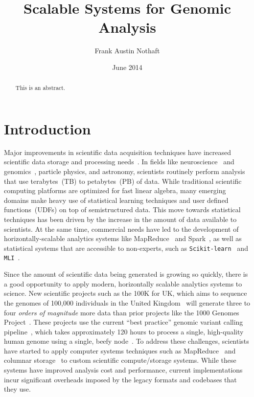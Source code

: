 \documentclass[10pt]{report} %
\begin{document}
\title{Scalable Systems for Genomic Analysis}
\author{Frank Austin Nothaft}
\date{June 2014}
\maketitle

\begin{abstract}
This is an abstract.
\end{abstract}

\tableofcontents

\chapter{Introduction}

Major improvements in scientific data acquisition techniques have increased scientific data storage and
processing needs~\cite{cunningham14, schadt10}. In fields like
neuroscience~\cite{freeman14} and genomics~\cite{stein10}, particle physics, and astronomy,
scientists routinely perform analysis that use terabytes~(TB) to petabytes~(PB) of data.
While traditional scientific computing platforms are optimized for fast linear algebra, many emerging
domains make heavy use of statistical learning techniques and user defined functions~(UDFs) on top of
semistructured data. This move towards statistical techniques has been driven by the increase in the
amount of data available to scientists. At the same time, commercial needs have led to the development of
horizontally-scalable analytics systems like MapReduce~\cite{dean04, dean08} and Spark~\cite{zaharia10}, as
well as statistical systems that are accessible to non-experts, such as \texttt{Scikit-learn}~\cite{pedregosa11} and
\texttt{MLI}~\cite{sparks13}.

Since the amount of scientific data being generated is growing so quickly, there is a good opportunity to apply
modern, horizontally scalable analytics systems to science. New scientific
projects such as the 100K for UK, which aims to sequence the genomes of 100,000 individuals in the
United Kingdom~\cite{uk100k} will generate three to four \emph{orders of magnitude} more data than
prior projects like the 1000 Genomes Project~\cite{siva08}. These projects use the current ``best
practice'' genomic variant calling pipeline~\cite{auwera13}, which takes approximately 120 hours to
process a single, high-quality human genome using a single, beefy node~\cite{talwalkar14}. To address
these challenges, scientists have started to apply computer systems techniques such as
MapReduce~\cite{langmead09, mckenna10, schatz09} and columnar storage~\cite{fritz11} to custom
scientific compute/storage systems. While these systems have improved analysis cost and performance,
current implementations incur significant overheads imposed by the legacy formats and
codebases that they use.
\end{document}
